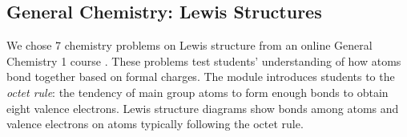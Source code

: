 





\subsection{General Chemistry: Lewis Structures}
\label{sec:chemistry}


We chose 7 chemistry problems on Lewis structure from an online General Chemistry 1 course \cite{oli}. These problems test students' understanding of how atoms bond together based on formal charges. The module introduces students to the \textit{octet rule}: the tendency of main group atoms to form enough bonds to obtain eight valence electrons. Lewis structure diagrams show bonds among atoms and valence electrons on atoms typically following the octet rule. 

